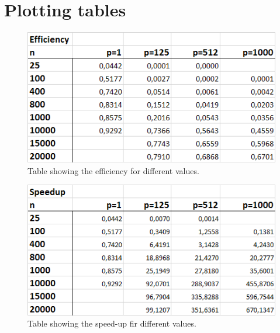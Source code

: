 \documentclass[a4paper,11pt,oneside]{book}
\begin{document}
\section{Plotting tables}
\begin{figure}[H]
  \centering
  \includegraphics[width=0.9\linewidth]{table-eff.png}
  \caption{Table showing the efficiency for different values.}
  \centering
  \label{fig:sub1}
\end{figure}
\begin{figure}[H]
  \centering
  \includegraphics[width=0.9\linewidth]{table-speedup.png}
  \caption{Table showing the speed-up fir different values.}
  \centering
  \label{fig:sub1}
\end{figure}
\end{document}
